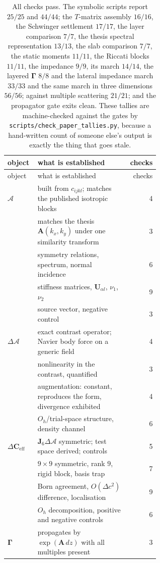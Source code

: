 \documentclass[11pt,a4paper]{article}
\newcommand{\bA}{\mathbf{A}}
\newcommand{\bU}{\mathbf{U}}
\newcommand{\Aop}{\mathcal{A}}
\newcommand{\dA}{\Delta\mathcal{A}}
\newcommand{\dCeff}{\Delta\mathbf{C}_{\mathrm{eff}}}
\newcommand{\Jsix}{\mathbf{J}_{6}}
\newcommand{\Oh}{O_{h}}
\begin{document}
\begin{longtable}{@{}l>{\raggedright\arraybackslash}p{0.60\linewidth}r@{}}
\caption{All checks pass.  The symbolic scripts report $25/25$ and
$44/44$; the $T$-matrix assembly $16/16$, the Schwinger settlement $17/17$, the
layer comparison $7/7$, the thesis spectral representation $13/13$, the slab
comparison $7/7$, the static moments $11/11$, the Riccati blocks $11/11$, the
impedance $9/9$, its march $14/14$, the layered $\boldsymbol\Gamma$ $8/8$ and
the lateral impedance march $33/33$ and the same march in three dimensions
$56/56$; against multiple scattering $21/21$; and the propagator gate exits clean.
These tallies are machine-checked against the gates by
\texttt{scripts/check\_paper\_tallies.py}, because a hand-written count of
someone else's output is exactly the thing that goes stale.}\\
\toprule
object & what is established & checks\\
\midrule
\endfirsthead
\toprule
object & what is established & checks\\
\midrule
\endhead
\bottomrule
\endlastfoot
$\Aop$ & built from $c_{ijkl}$; matches the published isotropic blocks & 4\\
       & matches the thesis $\bA(k_x,k_y)$ under one similarity transform & 3\\
       & symmetry relations, spectrum, normal incidence & 6\\
       & stiffness matrices, $\bU_{\alpha l}$, $\nu_1$, $\nu_2$ & 9\\
       & source vector, negative control & 3\\
\midrule
$\dA$  & exact contrast operator; Navier body force on a generic field & 4\\
       & nonlinearity in the contrast, quantified & 3\\
       & augmentation: constant, reproduces the form, divergence exhibited & 4\\
       & $\Oh$/trial-space structure, density channel & 6\\
\midrule
$\dCeff$ & $\Jsix\dA$ symmetric; test space derived; controls & 5\\
         & $9\times9$ symmetric, rank $9$, rigid block, basis trap & 7\\
         & Born agreement, $O(\Delta c^2)$ difference, localisation & 9\\
         & $\Oh$ decomposition, positive and negative controls & 6\\
\midrule
$\boldsymbol\Gamma$ & propagates by $\exp(\bA\,dz)$ with all multiples present & 3\\

\end{longtable}
\end{document}
